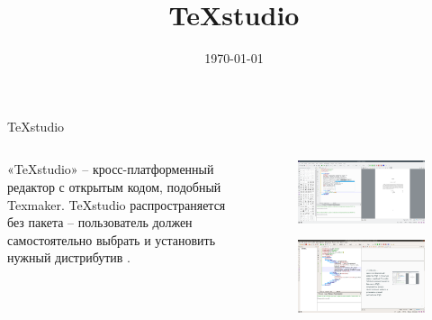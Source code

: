 \documentclass[11pt]{beamer}
\title{TeXstudio}
\date{\today}
\begin{document}
	\maketitle
	\begin{frame}{TeXstudio}
		\begin{columns}[c,onlytextwidth]
			\begin{column}{0.44\textwidth}
					«TeXstudio» -- кросс-платформенный редактор \text{\LaTeX} с открытым кодом, подобный Texmaker.
					TeXstudio распространяется без пакета \text{\LaTeX} -- пользователь должен самостоятельно выбрать и установить нужный дистрибутив \text{\LaTeX}.  
			\end{column}
			\begin{column}{0.50\textwidth}
				\begin{figure}
					\centering
					\includegraphics[width=\textwidth]{res/TeXstudio.png}
				\end{figure}
				\begin{figure}
					\centering
					\includegraphics[width=\textwidth]{res/myscreen.png}
				\end{figure}
			\end{column}
		\end{columns}
	\end{frame}
\end{document}
